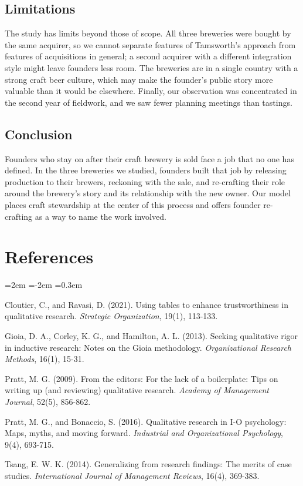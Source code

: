 \documentclass[12pt]{article}
\begin{document}
\subsection{Limitations}

The study has limits beyond those of scope. All three breweries were bought by the same acquirer, so we cannot separate features of Tamsworth's approach from features of acquisitions in general; a second acquirer with a different integration style might leave founders less room. The breweries are in a single country with a strong craft beer culture, which may make the founder's public story more valuable than it would be elsewhere. Finally, our observation was concentrated in the second year of fieldwork, and we saw fewer planning meetings than tastings.

\subsection{Conclusion}

Founders who stay on after their craft brewery is sold face a job that no one has defined. In the three breweries we studied, founders built that job by releasing production to their brewers, reckoning with the sale, and re-crafting their role around the brewery's story and its relationship with the new owner. Our model places craft stewardship at the center of this process and offers founder re-crafting as a way to name the work involved.

\section*{References}

\begin{list}{}{\leftmargin=2em \itemindent=-2em \itemsep=0.3em}
\item Cloutier, C., and Ravasi, D. (2021). Using tables to enhance trustworthiness in qualitative research. \textit{Strategic Organization}, 19(1), 113-133.
\item Gioia, D. A., Corley, K. G., and Hamilton, A. L. (2013). Seeking qualitative rigor in inductive research: Notes on the Gioia methodology. \textit{Organizational Research Methods}, 16(1), 15-31.
\item Pratt, M. G. (2009). From the editors: For the lack of a boilerplate: Tips on writing up (and reviewing) qualitative research. \textit{Academy of Management Journal}, 52(5), 856-862.
\item Pratt, M. G., and Bonaccio, S. (2016). Qualitative research in I-O psychology: Maps, myths, and moving forward. \textit{Industrial and Organizational Psychology}, 9(4), 693-715.
\item Tsang, E. W. K. (2014). Generalizing from research findings: The merits of case studies. \textit{International Journal of Management Reviews}, 16(4), 369-383.
\end{list}
\end{document}
